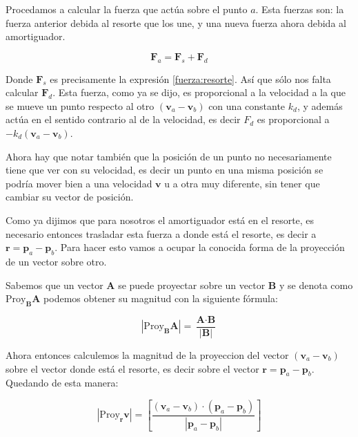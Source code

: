Procedamos a calcular la fuerza que actúa sobre el punto $a$.
Esta fuerzas son: la fuerza anterior debida al resorte que los une, y una nueva fuerza ahora debida al amortiguador.

\begin{equation}
\textbf{F}_a = \textbf{F}_s + \textbf{F}_d
\end{equation}

Donde $\textbf{F}_s$ es precisamente la expresión \eqref{fuerza:resorte}. Así que sólo nos falta calcular $\textbf{F}_d$.
Esta fuerza, como ya se dijo, es proporcional a la velocidad a la que se mueve un punto respecto al otro $\left( \textbf{v}_a - \textbf{v}_b \right)$ con una constante $k_d$, y además actúa en el sentido contrario al de la velocidad, es decir $F_d$ es proporcional a $-k_d \left( \textbf{v}_a - \textbf{v}_b \right)$.


Ahora hay que notar también que la posición de un punto no necesariamente tiene que ver con su velocidad, es decir un punto en una misma posición se podría mover bien a una velocidad $\textbf{v}$ u a otra muy diferente, sin tener que cambiar su vector de posición.

Como ya dijimos que para nosotros el amortiguador está en el resorte, es necesario entonces trasladar esta fuerza a donde está el resorte, es decir a $\textbf{r} = \textbf{p}_a - \textbf{p}_b$.
Para hacer esto vamos a ocupar la conocida forma de la proyección de un vector sobre otro.

Sabemos que un vector $\textbf{A}$ se puede proyectar sobre un vector $\textbf{B}$ y se denota como $\mathrm{Proy}_{ \textbf{B} } \textbf{A}$ podemos obtener su magnitud con la siguiente fórmula:

\begin{equation}
| \mathrm{Proy}_{\textbf{B}} \textbf{A} | = \frac{ \textbf{A} \cdot \textbf{B} }{| \textbf{B} |}
\end{equation}

Ahora entonces calculemos la magnitud de la proyeccion del vector $\left( \textbf{v}_a - \textbf{v}_b \right)$ sobre el vector donde está el resorte, es decir sobre el vector $\textbf{r} = \textbf{p}_a - \textbf{p}_b$.
Quedando de esta manera:

\begin{equation}
 | \mathrm{Proy}_{ \textbf{r} } \textbf{v} | = \left[ \frac{ ( \textbf{v}_a - \textbf{v}_b ) \cdot ( \textbf{p}_a - \textbf{p}_b ) }{ | \textbf{p}_a - \textbf{p}_b | } \right]
\end{equation}

